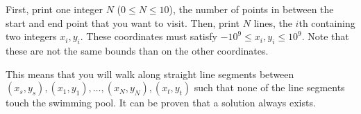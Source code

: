
First, print one integer $N$ ($0 \leq N \leq 10$), the number of points in between 
the start and end point that you want to visit. Then, print $N$ lines, the $i$th 
containing two integers $x_i, y_i$. 
These coordinates must satisfy $-10^9 \leq x_i, y_i \leq 10^9$. Note that these are not 
the same bounds than on the other coordinates.

This means that you will walk along straight 
line segments between $(x_s, y_s), (x_1, y_1), \dots, (x_N, y_N), (x_t, y_t)$ 
such that none of the line segments touch the swimming pool. It can be proven that a solution
always exists.
